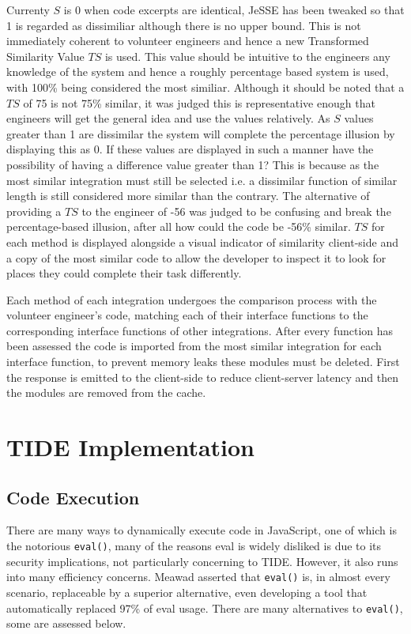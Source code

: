 \documentclass[jou,apacite]{apa6}
\begin{document}
Currenty $S$ is 0 when code excerpts are identical, JeSSE has been tweaked so that 1 is regarded as dissimiliar although there is no upper bound. This is not immediately coherent to volunteer engineers and hence a new Transformed Similarity Value $TS$ is used. This value should be intuitive to the engineers any knowledge of the system and hence a roughly percentage based system is used, with 100\% being considered the most similiar. Although it should be noted that a $TS$ of 75 is not 75\% similar, it was judged this is representative enough that engineers will get the general idea and use the values relatively. As $S$ values greater than 1 are dissimilar the system will complete the percentage illusion  by displaying this as 0. 
If these values are displayed in such a manner have the possibility of having a difference value greater than 1? This is because as the most similar integration must still be selected i.e. a dissimilar function of similar length is still considered more similar than the contrary. The alternative of providing a $TS$ to the engineer of -56 was judged to be confusing and break the percentage-based illusion, after all how could the code be -56\% similar. $TS$ for each method is displayed alongside a visual indicator of similarity client-side and a copy of the most similar code to allow the developer to inspect it to look for places they could complete their task differently. 

Each method of each integration undergoes the comparison process with the volunteer engineer's code, matching each of their interface functions to the corresponding interface functions of other integrations. After every function has been assessed the code is imported from the most similar integration for each interface function, to prevent memory leaks these modules must be deleted. First the response is emitted to the client-side to reduce client-server latency and then the modules are removed from the cache.

\clearpage

\section{TIDE Implementation}
\subsection{Code Execution}
There are many ways to dynamically execute code in JavaScript, one of which is the notorious \texttt{eval()}, many of the reasons eval is widely disliked is due to its security implications, not particularly concerning to TIDE. However,  it also runs into many efficiency concerns. Meawad \cite{Meawad2012} asserted that \texttt{eval()} is, in almost every scenario, replaceable by a superior alternative, even developing a tool that automatically replaced 97\% of eval usage. There are many alternatives to \texttt{eval()}, some are assessed below.
\end{document}
